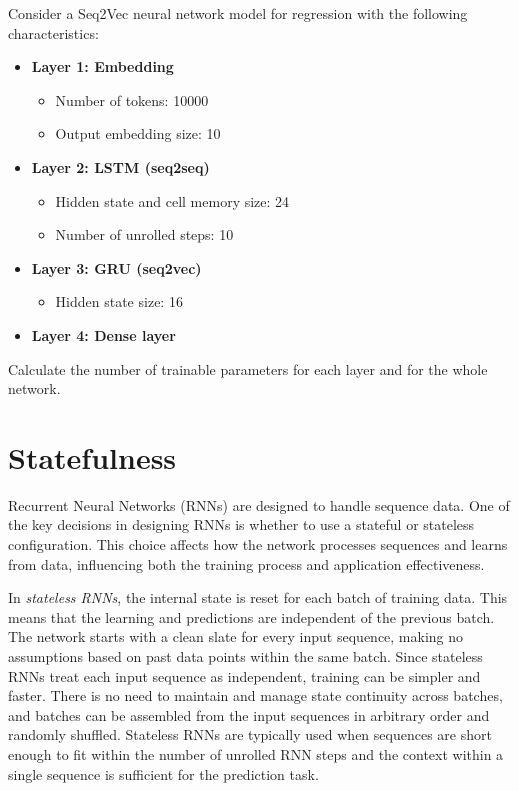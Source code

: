 \begin{exerciseboxpaper}
Consider a Seq2Vec neural network model for regression with the following characteristics:

\begin{itemize}
   \item \textbf{Layer 1: Embedding}
   \begin{itemize}
      \item Number of tokens: 10000
      \item Output embedding size: 10
   \end{itemize}
   \item \textbf{Layer 2: LSTM (seq2seq)}
   \begin{itemize}
      \item Hidden state and cell memory size: 24
      \item Number of unrolled steps: 10
   \end{itemize}
   \item \textbf{Layer 3: GRU (seq2vec)}
   \begin{itemize}
      \item Hidden state size: 16
   \end{itemize}
   \item \textbf{Layer 4: Dense layer}
\end{itemize}

Calculate the number of trainable parameters for each layer and for the whole network.
\end{exerciseboxpaper}


\section{Statefulness}

Recurrent Neural Networks (RNNs) are designed to handle sequence data. One of the key decisions in designing RNNs is whether to use a stateful or stateless configuration. This choice affects how the network processes sequences and learns from data, influencing both the training process and application effectiveness.

In \emph{stateless RNNs}, the internal state is reset for each batch of training data. This means that the learning and predictions are independent of the previous batch. The network starts with a clean slate for every input sequence, making no assumptions based on past data points within the same batch. Since stateless RNNs treat each input sequence as independent, training can be simpler and faster. There is no need to maintain and manage state continuity across batches, and batches can be assembled from the input sequences in arbitrary order and randomly shuffled. Stateless RNNs are typically used when sequences are short enough to fit within the number of unrolled RNN steps and the context within a single sequence is sufficient for the prediction task.

